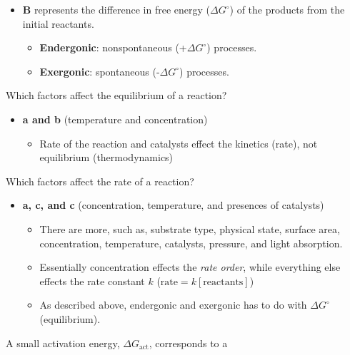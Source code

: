 \documentclass[12pt,a4paper]{article}
\begin{document}
\begin{enumerate}
\begin{itemize}
\begin{itemize}
                \item \textbf{B} represents the difference in free energy (\(\Delta G^\circ\)) of the products from the initial reactants.
                    \begin{itemize}
                        \item {\color{pos}\textbf{Endergonic}}: {\color{o-Sun}nonspontaneous} ({\color{pos}+\(\Delta G^\circ\)}) processes.
                        \item {\color{neg}\textbf{Exergonic}}: {\color{o-Sun}spontaneous} ({\color{neg}-\(\Delta G^\circ\)}) processes.
                    \end{itemize}
            \end{itemize}
        \end{itemize}
    {\color{G-Moon}\item Which factors affect the equilibrium of a reaction?}
        \begin{itemize}
            \item {\color{o-Sun}\textbf{a and b} (temperature and concentration)} 
            \begin{itemize}
                \item Rate of the reaction and catalysts effect the kinetics (rate), not equilibrium (thermodynamics)
            \end{itemize}
        \end{itemize}
    \newpage
    {\color{G-Moon}\item Which factors affect the rate of a reaction?}
        \begin{itemize}
            \item {\color{o-Sun}\textbf{a, c, and c} (concentration, temperature, and presences of catalysts)} 
            \begin{itemize}
                \item There are more, such as, substrate type, physical state, surface area, concentration, temperature, catalysts, pressure, and light absorption. 
                \item Essentially concentration effects the \textit{rate order}, while everything else effects the rate constant \(k\) (\(\text{rate} = k[\text{reactants}]\))
                \item As described above, endergonic and exergonic has to do with \(\Delta G^\circ\) (equilibrium).
            \end{itemize}
        \end{itemize}
    {\color{G-Moon}\item A small activation energy, \(\Delta G_{\text{act}}\), corresponds to a}

\end{enumerate}
\end{document}
